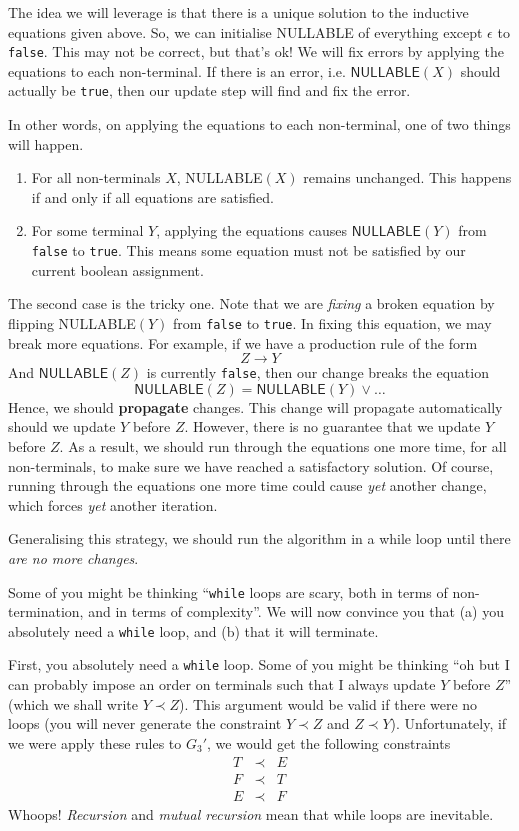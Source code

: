 The idea we will leverage is that there is a unique solution to the inductive equations given above. So, we can initialise \textsf{NULLABLE} of everything except $\epsilon$ to \texttt{false}. This may not be correct, but that's ok! We will fix errors by applying the equations to each non-terminal. If there is an error, i.e. $\textsf{NULLABLE}(X)$ should actually be \texttt{true}, then our update step will find and fix the error.

In other words, on applying the equations to each non-terminal, one of two things will happen. 

\begin{enumerate}
    \item For all non-terminals $X$, \textsf{NULLABLE}$(X)$ remains unchanged. This happens if and only if all equations are satisfied.
    \item For some terminal $Y$, applying the equations causes $\textsf{NULLABLE}(Y)$ from \texttt{false} to \texttt{true}. This means some equation must not be satisfied by our current boolean assignment.
\end{enumerate}

The second case is the tricky one. Note that we are \textit{fixing} a broken equation by flipping \textsf{NULLABLE}$(Y)$ from \texttt{false} to \texttt{true}. In fixing this equation, we may break more equations. For example, if we have a production rule of the form
\[ Z \to Y \]
And $\textsf{NULLABLE}(Z)$ is currently \texttt{false}, then our change breaks the equation 
\[ \textsf{NULLABLE}(Z) = \textsf{NULLABLE}(Y) \lor \ldots \] 
Hence, we should \textbf{propagate} changes. This change will propagate automatically should we update $Y$ before $Z$. However, there is no guarantee that we update $Y$ before $Z$. As a result, we should run through the equations one more time, for all non-terminals, to make sure we have reached a satisfactory solution. Of course, running through the equations one more time could cause \textit{yet} another change, which forces \textit{yet} another iteration.

Generalising this strategy, we should run the algorithm in a while loop until there \textit{are no more changes}.

Some of you might be thinking ``\texttt{while} loops are scary, both in terms of non-termination, and in terms of complexity''. We will now convince you that (a) you absolutely need a \texttt{while} loop, and (b) that it will terminate.

First, you absolutely need a \texttt{while} loop. Some of you might be thinking ``oh but I can probably impose an order on terminals such that I always update $Y$ before $Z$'' (which we shall write $Y \prec Z$). This argument would be valid if there were no loops (you will never generate the constraint $Y \prec Z$ and $Z \prec Y$). Unfortunately, if we were apply these rules to $G_3'$, we would get the following constraints
\[\begin{array}{rcl}
     T&\prec&E  \\
     F&\prec&T  \\
     E&\prec&F
\end{array}\]
Whoops! \textit{Recursion} and \textit{mutual recursion} mean that while loops are inevitable. 

